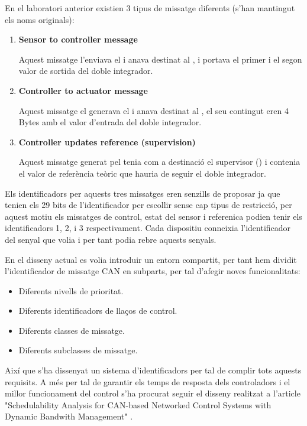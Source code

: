 En el laboratori anterior existien 3 tipus de missatge diferents (s'han mantingut els noms originals):
\begin{enumerate}
	\item \textbf{Sensor to controller message}
	
		Aquest missatge l'enviava el \Sensor i anava destinat al 
		\Controlador, i portava el primer i el segon valor de sortida 
		del doble integrador.
	\item \textbf{Controller to actuator message}
	
		Aquest missatge el generava el \Controlador i anava destinat
		al \Actuador, el seu contingut eren 4 Bytes amb el valor 
		d'entrada del doble integrador.
	\item \textbf{Controller updates reference (supervision)}
	
		Aquest missatge generat pel \Controlador tenia com a destinació el
		supervisor (\SensorActuador) i contenia el valor de referència
		teòric que hauria de seguir el doble integrador.
\end{enumerate}

Els identificadors per aquests tres missatges eren senzills de proposar ja que tenien els 29 bits de l'identificador per escollir sense cap tipus de restricció, per aquest motiu els missatges de control, estat del sensor i referenica podien tenir els identificadors 1, 2, i 3 respectivament. Cada dispositiu conneixia l'identificador del senyal que volia i per tant podia rebre aquests senyals.

En el disseny actual es volia introduir un entorn compartit, per tant hem dividit l'identificador de missatge CAN en subparts, per tal d'afegir noves funcionalitats:

 \begin{itemize}
 	\item Diferents nivells de prioritat.
 	\item Diferents identificadors de llaços de control.
 	\item Diferents classes de missatge.
 	\item Diferents subclasses de missatge. 
 \end{itemize}

Així que s'ha dissenyat un sistema d'identificadors per tal de complir tots aquests requisits. A més per tal de garantir els temps de resposta dels controladors i el millor funcionament del control s'ha procurat seguir el disseny realitzat a l'article "Schedulability Analysis for CAN-based Networked Control Systems with Dynamic Bandwith Management" \cite{SchAnaCANbasNCS}. 

